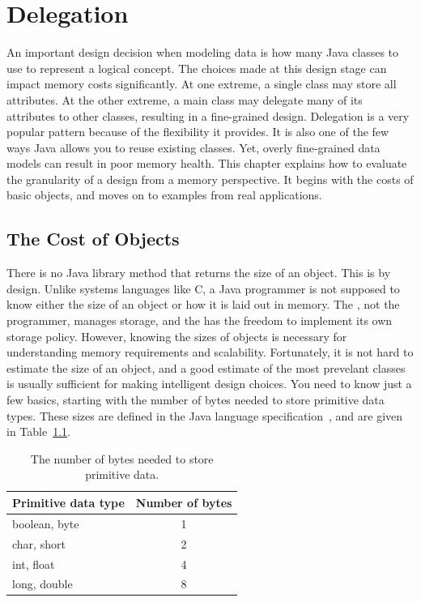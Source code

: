 \chapter{Delegation}

An important design decision when modeling data is how many Java classes to use to represent a logical concept. The choices made at this design stage can impact memory costs significantly. At one extreme, a single class may store all attributes. At the other extreme, a main class may delegate many of its attributes to other classes, resulting in a fine-grained design. Delegation is a very popular pattern because of the flexibility it provides. It is also one of the few ways Java allows you to reuse existing classes. Yet, overly fine-grained data models can result in poor memory health. This chapter explains how to evaluate the granularity of a design from a memory perspective. It begins with the costs of basic objects, and moves on to examples from real applications.
  
\section{The Cost of Objects}
\label{sec:CostOfObjects}

There is no Java library method that returns the size of an object. This is by
design. Unlike systems languages like C, a Java programmer is not supposed to
know either the size of an object or how it is laid out in memory. The \jre,
not the programmer, manages storage, and the \jre has the freedom to implement
its own storage policy. However, knowing the sizes of objects is necessary for understanding memory requirements and scalability. Fortunately, it is not hard to estimate the size of an object, and a good estimate of the most prevelant classes is usually sufficient for making intelligent design choices.  You need to know just a few basics, starting with the number of bytes needed to store primitive data types. These sizes are defined in the Java language specification~\cite{JavaSpec}, and are given in Table~\ref{tab:primitive-sizes}.
\begin{table}
  \centering
\begin{tabular}{lc} \toprule
	Primitive data type & Number of bytes \\ \midrule
	boolean, byte & 1 \\
	char, short & 2 \\
	int, float & 4 \\
	long, double & 8 \\
	\bottomrule
\end{tabular}
  \caption{The number of bytes needed to store primitive data.}
  \label{tab:primitive-sizes}
\end{table}

